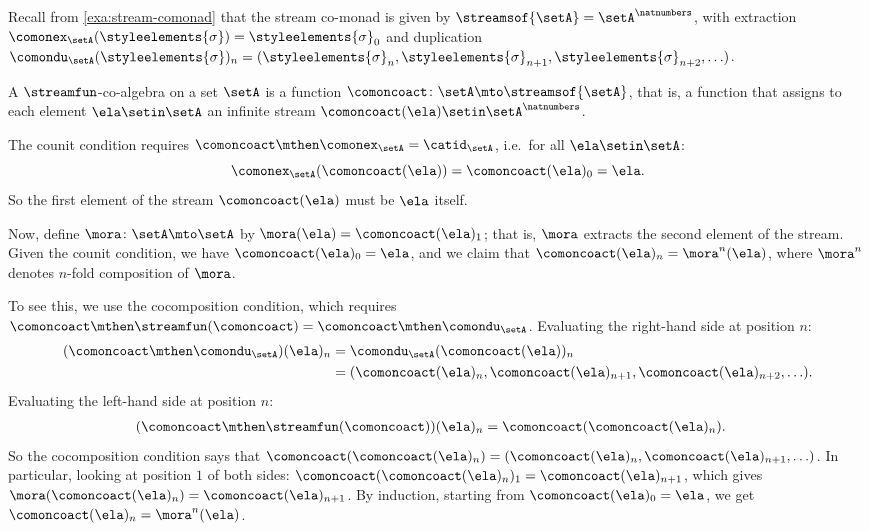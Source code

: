 \begin{example}
\label{exa:coalgebra-stream-comonad}

Recall from \cref{exa:stream-comonad} that the stream co-monad is given by $\streamsof{\setA} = \setA^{\natnumbers}$, with extraction $\comonex_\setA(\styleelements{\sigma}) = \styleelements{\sigma}_0$ and duplication $\comondu_\setA(\styleelements{\sigma})_n = (\styleelements{\sigma}_n, \styleelements{\sigma}_{n+1}, \styleelements{\sigma}_{n+2}, \ldots)$.

A $\streamfun$-co-algebra on a set $\setA$ is a function $\comoncoact \colon \setA \mto \streamsof{\setA}$, that is, a function that assigns to each element $\ela \setin \setA$ an infinite stream $\comoncoact(\ela) \setin \setA^{\natnumbers}$.

The counit condition requires $\comoncoact \mthen \comonex_\setA = \catid_\setA$, i.e.\ for all $\ela \setin \setA$:
\begin{equation*}
    \comonex_\setA(\comoncoact(\ela)) = \comoncoact(\ela)_0 = \ela.
\end{equation*}
So the first element of the stream $\comoncoact(\ela)$ must be $\ela$ itself.

Now, define $\mora \colon \setA \mto \setA$ by $\mora(\ela) = \comoncoact(\ela)_1$; that is, $\mora$ extracts the second element of the stream. Given the counit condition, we have $\comoncoact(\ela)_0 = \ela$, and we claim that $\comoncoact(\ela)_n = \mora^n(\ela)$, where $\mora^n$ denotes $n$-fold composition of $\mora$.

To see this, we use the cocomposition condition, which requires $\comoncoact \mthen \streamfun(\comoncoact) = \comoncoact \mthen \comondu_\setA$.
Evaluating the right-hand side at position $n$:
\begin{align*}
(\comoncoact \mthen \comondu_\setA)(\ela)_n
& = \comondu_\setA(\comoncoact(\ela))_n \\
& = (\comoncoact(\ela)_n, \comoncoact(\ela)_{n+1}, \comoncoact(\ela)_{n+2}, \ldots).
\end{align*}
Evaluating the left-hand side at position $n$:
\begin{align*}
(\comoncoact \mthen \streamfun(\comoncoact))(\ela)_n
& = \comoncoact(\comoncoact(\ela)_n).
\end{align*}
So the cocomposition condition says that $\comoncoact(\comoncoact(\ela)_n) = (\comoncoact(\ela)_n, \comoncoact(\ela)_{n+1}, \ldots)$. In particular, looking at position $1$ of both sides: $\comoncoact(\comoncoact(\ela)_n)_1 = \comoncoact(\ela)_{n+1}$, which gives $\mora(\comoncoact(\ela)_n) = \comoncoact(\ela)_{n+1}$. By induction, starting from $\comoncoact(\ela)_0 = \ela$, we get $\comoncoact(\ela)_n = \mora^n(\ela)$.


\end{example}
